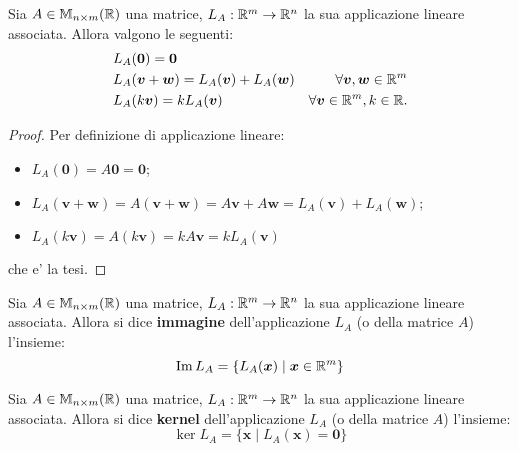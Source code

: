 \begin{proposition}
    Sia $A \in \mathbb{M}_{n \times m}(\mathbb{R})$ una matrice, $L_A : \mathbb{R}^m \to \mathbb{R}^n$ la sua applicazione lineare associata. Allora valgono le seguenti:
    \begin{align}
        &L_A(\bm 0) = \bm 0 \\
        &L_A(\bm v + \bm w) = L_A(\bm v) + L_A(\bm w) &\forall \bm v, \bm w \in \mathbb{R}^m \\
        &L_A(k\bm v) = kL_A(\bm v) &\forall \bm v \in \mathbb{R}^m, k \in \mathbb{R}. 
    \end{align}
\end{proposition}
\begin{proof}
    Per definizione di applicazione lineare:
    \begin{itemize}
        \item $L_A(\bm 0) = A\bm 0 = \bm 0$;
        \item $L_A(\bm v + \bm w) = A(\bm v + \bm w) = A\bm v + A\bm w = L_A(\bm v) + L_A(\bm w)$;
        \item $L_A(k\bm v) = A(k\bm v) = kA\bm v = kL_A(\bm v)$
    \end{itemize}
    che e' la tesi.
\end{proof}

\begin{definition}
    Sia $A \in \mathbb{M}_{n \times m}(\mathbb{R})$ una matrice, $L_A : \mathbb{R}^m \to \mathbb{R}^n$ la sua applicazione lineare associata. Allora si dice \textbf{immagine} dell'applicazione $L_A$ (o della matrice $A$) l'insieme:
    \begin{equation}
        \operatorname{Im}L_A = \{L_A(\bm x) \mid \bm x \in \mathbb{R}^m\}
    \end{equation}
\end{definition}

\begin{definition}
    Sia $A \in \mathbb{M}_{n \times m}(\mathbb{R})$ una matrice, $L_A : \mathbb{R}^m \to \mathbb{R}^n$ la sua applicazione lineare associata. Allora si dice \textbf{kernel} dell'applicazione $L_A$ (o della matrice $A$) l'insieme:
    \begin{equation}
        \ker{L_A} = \{\bm x \mid L_A(\bm x) = \bm 0\}
    \end{equation}
\end{definition}